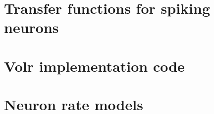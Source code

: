 \documentclass[a4paper,oneside]{memoir}
\begin{document}
\appendix
\chapter{Transfer functions for spiking neurons} \label{app:transfer}

\chapter{Volr implementation code} \label{app:implementation}
  
\chapter{Neuron rate models} \label{app:verification}
  

\backmatter

\printglossary

\printbibliography
 
\printindex
\end{document}
